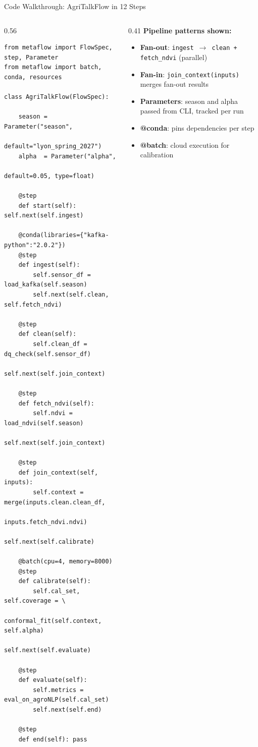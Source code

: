 \documentclass[10pt,aspectratio=169]{beamer}
\newcommand{\Key}[1]{\textcolor{mfblue}{\textbf{#1}}}
\begin{document}
\begin{frame}[fragile]{Code Walkthrough: AgriTalkFlow in 12 Steps}

\begin{columns}
\begin{column}{0.56\textwidth}
\begin{lstlisting}[title={\scriptsize agritalk\_flow.py -- simplified structure}]
from metaflow import FlowSpec, step, Parameter
from metaflow import batch, conda, resources

class AgriTalkFlow(FlowSpec):

    season = Parameter("season",
                       default="lyon_spring_2027")
    alpha  = Parameter("alpha",
                       default=0.05, type=float)

    @step
    def start(self): self.next(self.ingest)

    @conda(libraries={"kafka-python":"2.0.2"})
    @step
    def ingest(self):
        self.sensor_df = load_kafka(self.season)
        self.next(self.clean, self.fetch_ndvi)

    @step
    def clean(self):
        self.clean_df = dq_check(self.sensor_df)
        self.next(self.join_context)

    @step
    def fetch_ndvi(self):
        self.ndvi = load_ndvi(self.season)
        self.next(self.join_context)

    @step
    def join_context(self, inputs):
        self.context = merge(inputs.clean.clean_df,
                             inputs.fetch_ndvi.ndvi)
        self.next(self.calibrate)

    @batch(cpu=4, memory=8000)
    @step
    def calibrate(self):
        self.cal_set, self.coverage = \
            conformal_fit(self.context, self.alpha)
        self.next(self.evaluate)

    @step
    def evaluate(self):
        self.metrics = eval_on_agroNLP(self.cal_set)
        self.next(self.end)

    @step
    def end(self): pass
\end{lstlisting}
\end{column}
\begin{column}{0.41\textwidth}
\small
\textbf{Pipeline patterns shown:}
\begin{itemize}
  \item \Key{Fan-out}: \texttt{ingest $\to$ clean + fetch\_ndvi} (parallel)
  \item \Key{Fan-in}: \texttt{join\_context(inputs)} merges fan-out results
  \item \Key{Parameters}: season and alpha passed from CLI, tracked per run
  \item \Key{@conda}: pins dependencies per step
  \item \Key{@batch}: cloud execution for calibration
\end{itemize}


\end{column}
\end{columns}
\end{frame}
\end{document}
